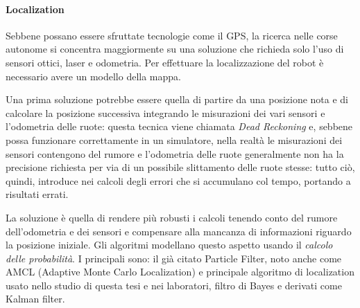 \paragraph{Localization}
Sebbene possano essere sfruttate tecnologie come il GPS, la ricerca nelle corse autonome si concentra
maggiormente su una soluzione che richieda solo l'uso di sensori ottici, laser e odometria. \cite{betz2022autonomous}
Per effettuare la localizzazione del robot è necessario avere un modello della mappa.

Una prima soluzione potrebbe essere quella di partire da una posizione nota e di calcolare la posizione
successiva integrando le misurazioni dei vari sensori e l'odometria delle ruote: questa tecnica
viene chiamata \textit{Dead Reckoning} e, sebbene possa funzionare correttamente in un simulatore, nella
realtà le misurazioni dei sensori contengono del rumore e l'odometria delle ruote generalmente non ha
la precisione richiesta per via di un possibile slittamento delle ruote stesse: tutto ciò, quindi,
introduce nei calcoli degli errori che si accumulano col tempo, portando a risultati errati.

La soluzione è quella di rendere più robusti i calcoli tenendo conto del rumore dell'odometria e dei sensori
e compensare alla mancanza di informazioni riguardo la posizione iniziale. Gli algoritmi modellano questo
aspetto usando il \textit{calcolo delle probabilità}. I principali sono: il già citato Particle Filter,
noto anche come AMCL (Adaptive Monte Carlo Localization) e principale algoritmo di localization usato 
nello studio di questa tesi e nei laboratori, filtro di Bayes e derivati come Kalman filter.


